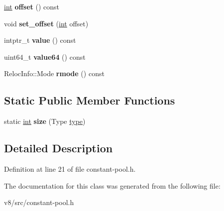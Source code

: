 \begin{DoxyCompactItemize}
\item 
\mbox{\label{classv8_1_1internal_1_1ConstantPoolEntry_a86c735e8ab9811d8b0c442efcc3b6ab2}} 
\mbox{\hyperlink{classint}{int}} {\bfseries offset} () const
\item 
\mbox{\label{classv8_1_1internal_1_1ConstantPoolEntry_a8d63e159ab6e3dc4bdfa6c7b317dc898}} 
void {\bfseries set\+\_\+offset} (\mbox{\hyperlink{classint}{int}} offset)
\item 
\mbox{\label{classv8_1_1internal_1_1ConstantPoolEntry_a3ece91621f31dbf81f9bf4befc65d3b0}} 
intptr\+\_\+t {\bfseries value} () const
\item 
\mbox{\label{classv8_1_1internal_1_1ConstantPoolEntry_a902d87dbfab074fd20a1ef5d553930f2}} 
uint64\+\_\+t {\bfseries value64} () const
\item 
\mbox{\label{classv8_1_1internal_1_1ConstantPoolEntry_a97af118195afdf4c79202a9c541139ba}} 
Reloc\+Info\+::\+Mode {\bfseries rmode} () const
\end{DoxyCompactItemize}
\subsection*{Static Public Member Functions}
\begin{DoxyCompactItemize}
\item 
\mbox{\label{classv8_1_1internal_1_1ConstantPoolEntry_a11980869d87e0390dcea4827cc067fb0}} 
static \mbox{\hyperlink{classint}{int}} {\bfseries size} (Type \mbox{\hyperlink{classstd_1_1conditional_1_1type}{type}})
\end{DoxyCompactItemize}


\subsection{Detailed Description}


Definition at line 21 of file constant-\/pool.\+h.



The documentation for this class was generated from the following file\+:\begin{DoxyCompactItemize}
\item 
v8/src/constant-\/pool.\+h\end{DoxyCompactItemize}
